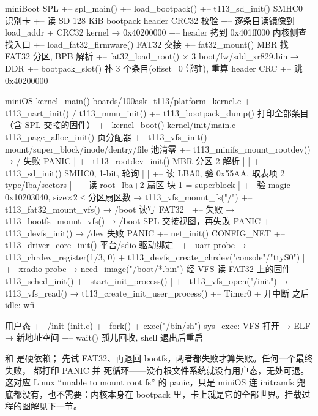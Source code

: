 \begin{txtcode}[basicstyle=\ttfamily\scriptsize]
miniBoot SPL
+-- spl_main()
    +-- load_bootpack()
        +-- t113_sd_init()                    SMHC0 识别卡
        +-- 读 SD 128 KiB bootpack header     CRC32 校验
        +-- 逐条目读镜像到 load_addr + CRC32  kernel → 0x40200000
        +-- header 拷到 0x401ff000            内核侧查找入口
        +-- load_fat32_firmware()             FAT32 交接
            +-- fat32_mount()                 MBR 找 FAT32 分区, BPB 解析
            +-- fat32_load_root() × 3         boot/fw/sdd_xr829.bin → DDR
            +-- bootpack_slot()               补 3 个条目(offset=0 常驻), 重算 header CRC
        +-- 跳 0x40200000

miniOS kernel_main()                          boards/100ask_t113/platform_kernel.c
+-- t113_uart_init() / t113_mmu_init()
+-- t113_bootpack_dump()                      打印全部条目（含 SPL 交接的固件）
+-- kernel_boot()                             kernel/init/main.c
    +-- t113_page_alloc_init()                页分配器
    +-- t113_vfs_init()                       mount/super_block/inode/dentry/file 池清零
    +-- t113_minifs_mount_rootdev()           → /       失败 PANIC
    |   +-- t113_rootdev_init()               MBR 分区 2 解析
    |   |   +-- t113_sd_init()                SMHC0, 1-bit, 轮询
    |   |   +-- 读 LBA0, 验 0x55AA, 取表项 2  type/lba/sectors
    |   +-- 读 root_lba+2 扇区                块 1 = superblock
    |   +-- 验 magic 0x10203040, size×2 ≤ 分区扇区数 → t113_vfs_mount_fs("/")
    +-- t113_fat32_mount_vfs()                → /boot   读写 FAT32
    |   +-- 失败 → t113_bootfs_mount_vfs()    → /boot   SPL 交接视图，再失败 PANIC
    +-- t113_devfs_init()                     → /dev    失败 PANIC
    +-- net_init()                            CONFIG_NET
    +-- t113_driver_core_init()               平台/sdio 驱动绑定
    |   +-- uart probe → t113_chrdev_register(1/3, 0) + t113_devfs_create_chrdev("console"/"ttyS0")
    |   +-- xradio probe → need_image("/boot/*.bin")  经 VFS 读 FAT32 上的固件
    +-- t113_sched_init()
    +-- start_init_process()
    |   +-- t113_vfs_open("/init") → t113_vfs_read() → t113_create_init_user_process()
    +-- Timer0 + 开中断                       之后 idle: wfi

用户态
+-- /init (init.c)
    +-- fork() + exec("/bin/sh")              sys_exec: VFS 打开 → ELF → 新地址空间
    +-- wait() 孤儿回收, shell 退出后重启
\end{txtcode}

\file{/} 和  是硬依赖； 先试 FAT32、再退回 bootfs，两者都失败才算失败。任何一个最终失败， 都打印 PANIC 并  死循环——没有根文件系统就没有用户态，无处可退。这对应 Linux “unable to mount root fs” 的 panic，只是 miniOS 连 initramfs 兜底都没有，也不需要：内核本身在 bootpack 里，卡上就是它的全部世界。挂载过程的图解见下一节。

